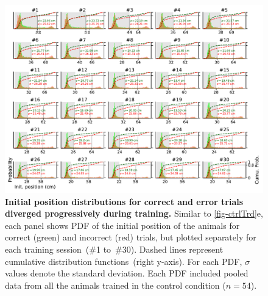 \begin{figure}[!h]
  \begin{center}
    \includegraphics[width=.8\linewidth]{ch-appendicies/figures/InitPos.pdf}
    \caption[Initial position evolution]
    {\textbf{Initial position distributions for correct and error trials diverged progressively during training.}
    Similar to \autoref{fig-ctrlTrd}e, each panel shows PDF of the initial position of the animals for correct (green) and incorrect (red) trials, but plotted separately for each training session~(\#1 to~\#30).
    Dashed lines represent cumulative distribution functions~(right y-axis).
    For each PDF, $\sigma$ values denote the standard deviation.
    Each PDF included pooled data from all the animals trained in the control condition ($n=54$).
    }
    \label{fig:appendix:initPos}
  \end{center}
\end{figure} 
